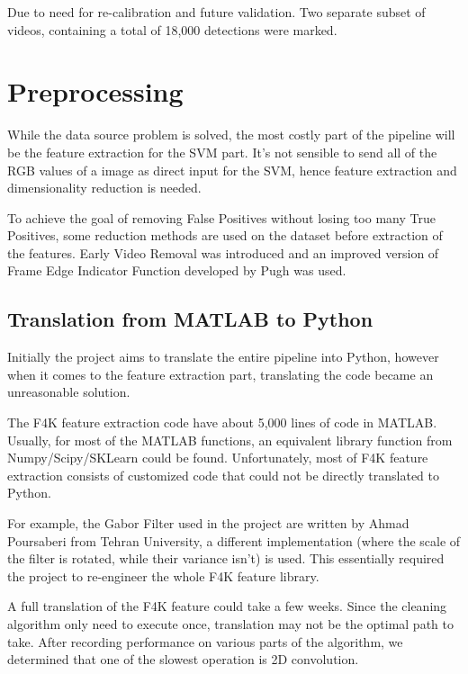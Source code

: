 \documentclass[bsc,logo,twoside,fullspacing,parskip]{infthesis}
\begin{document}
Due to need for re-calibration and future validation. Two separate subset of videos, containing a total of 18,000 detections were marked.

\chapter{Preprocessing}
\label{chap:prepro}

While the data source problem is solved, the most costly part of the pipeline will be the feature extraction for the SVM part. 
It's not sensible to send all of the RGB values of a image as direct input for the SVM, hence feature extraction and dimensionality reduction is needed.

To achieve the goal of removing False Positives without losing too many True Positives, some reduction methods are used on the dataset before extraction of the features. 
Early Video Removal was introduced and an improved version of Frame Edge Indicator Function developed by Pugh was used.

\section{Translation from MATLAB to Python}
\label{sec:translate}

Initially the project aims to translate the entire pipeline into Python, however when it comes to the feature extraction part, translating the code became an unreasonable solution.

The F4K feature extraction code have about 5,000 lines of code in MATLAB.
Usually, for most of the MATLAB functions, an equivalent library function from Numpy/Scipy/SKLearn could be found.
Unfortunately, most of F4K feature extraction consists of customized code that could not be directly translated to Python.

For example, the Gabor Filter used in the project are written by Ahmad Poursaberi from Tehran University, a different implementation (where the scale of the filter is rotated, while their variance isn't) is used. 
This essentially required the project to re-engineer the whole F4K feature library.

A full translation of the F4K feature could take a few weeks. Since the cleaning algorithm only need to execute once, translation may not be the optimal path to take. After recording performance on various parts of the algorithm, we determined that one of the slowest operation is 2D convolution.
\end{document}
